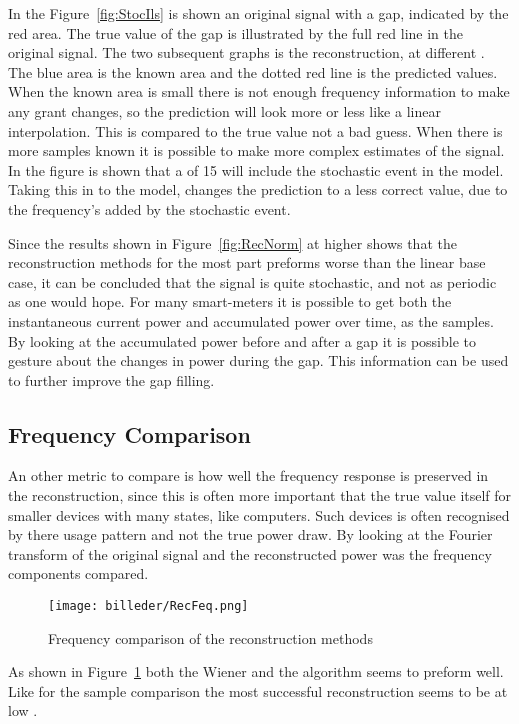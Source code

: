 In the Figure~\ref{fig:StocIls} is shown an original signal with a gap, indicated by the red area. The true value of the gap is illustrated by the full red line in the original signal. The two subsequent graphs is the reconstruction, at different . The blue area is the known area and the dotted red line is the predicted values. When the known area is small there is not enough frequency information to make any grant changes, so the prediction will look more or less like a linear interpolation. This is compared to the true value not a bad guess. When there is more samples known it is possible to make more complex estimates of the signal. In the figure is shown that a  of 15 will include the stochastic event in the model. Taking this in to the model, changes the prediction to a less correct value, due to the frequency's added by the stochastic event. 

Since the results shown in Figure~\ref{fig:RecNorm} at higher  shows that the reconstruction methods for the most part preforms worse than the linear base case, it can be concluded that the signal is quite stochastic, and not as periodic as one would hope. For many smart-meters it is possible to get both the instantaneous current power and accumulated power over time, as the samples. By looking at the accumulated power before and after a gap it is possible to gesture about the changes in power during the gap. This information can be used to further improve the gap filling. 

\newpage

\subsection{Frequency Comparison}
An other metric to compare is how well the frequency response is preserved in the reconstruction, since this is often more important that the true value itself for smaller devices with many states, like computers. Such devices is often recognised by there usage pattern and not the true power draw. By looking at the Fourier transform of the original signal and the reconstructed power was the frequency components compared. 

\begin{figure}[H]
\centering
\texttt{[image: billeder/RecFeq.png]}
\caption{Frequency comparison of the reconstruction methods}
\label{fig:RecFeq}
\end{figure}

As shown in Figure~\ref{fig:RecFeq} both the Wiener and the  algorithm seems to preform well. Like for the sample comparison the most successful reconstruction seems to be at low . 

